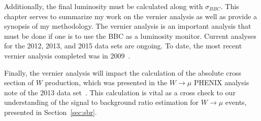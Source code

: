 Additionally, the final luminosity must be calculated along with $\sigma_{BBC}$.
This chapter serves to summarize my work on the vernier analysis as well as
provide a synopsis of my methodology. The vernier analysis is an important
analysis that must be done if one is to use the BBC as a luminosity monitor.
Current analyses for the 2012, 2013, and 2015 data sets are ongoing.  To date,
the most recent vernier analysis completed was in 2009~\cite{AN888Datta2010}.

Finally, the vernier analysis will impact the calculation of the absolute cross
section of $W$ production, which was presented in the $W\rightarrow\mu$ PHENIX
analysis note of the 2013 data set~\cite{Seidl2014a}. This calculation is vital
as a cross check to our understanding of the signal to background ratio
estimation for $W\rightarrow\mu$ events, presented in Section~\ref{sec:sbr}.
